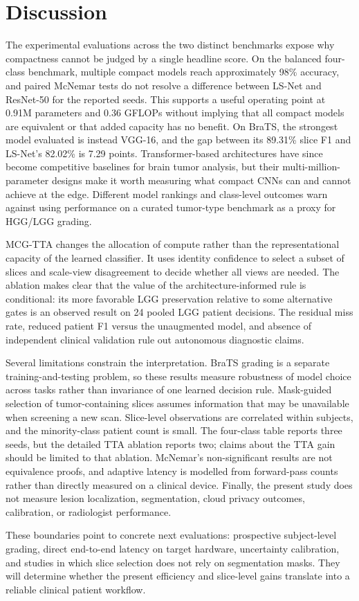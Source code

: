 \section{Discussion}

The experimental evaluations across the two distinct benchmarks expose why compactness cannot be judged by a single headline score. On the balanced four-class benchmark, multiple compact models reach approximately 98\% accuracy, and paired McNemar tests do not resolve a difference between LS-Net and ResNet-50 for the reported seeds. This supports a useful operating point at 0.91M parameters and 0.36 GFLOPs without implying that all compact models are equivalent or that added capacity has no benefit. On BraTS, the strongest model evaluated is instead VGG-16, and the gap between its 89.31\% slice F1 and LS-Net's 82.02\% is 7.29 points. Transformer-based architectures have since become competitive baselines for brain tumor analysis, but their multi-million-parameter designs make it worth measuring what compact CNNs can and cannot achieve at the edge. Different model rankings and class-level outcomes warn against using performance on a curated tumor-type benchmark as a proxy for HGG/LGG grading.

MCG-TTA changes the allocation of compute rather than the representational capacity of the learned classifier. It uses identity confidence to select a subset of slices and scale-view disagreement to decide whether all views are needed. The ablation makes clear that the value of the architecture-informed rule is conditional: its more favorable LGG preservation relative to some alternative gates is an observed result on 24 pooled LGG patient decisions. The residual miss rate, reduced patient F1 versus the unaugmented model, and absence of independent clinical validation rule out autonomous diagnostic claims.

Several limitations constrain the interpretation. BraTS grading is a separate training-and-testing problem, so these results measure robustness of model choice across tasks rather than invariance of one learned decision rule. Mask-guided selection of tumor-containing slices assumes information that may be unavailable when screening a new scan. Slice-level observations are correlated within subjects, and the minority-class patient count is small. The four-class table reports three seeds, but the detailed TTA ablation reports two; claims about the TTA gain should be limited to that ablation. McNemar's non-significant results are not equivalence proofs, and adaptive latency is modelled from forward-pass counts rather than directly measured on a clinical device. Finally, the present study does not measure lesion localization, segmentation, cloud privacy outcomes, calibration, or radiologist performance.

These boundaries point to concrete next evaluations: prospective subject-level grading, direct end-to-end latency on target hardware, uncertainty calibration, and studies in which slice selection does not rely on segmentation masks. They will determine whether the present efficiency and slice-level gains translate into a reliable clinical patient workflow.
